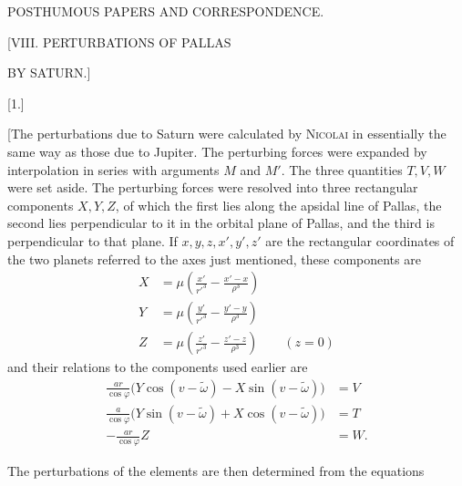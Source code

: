 \clearpage
\begingroup
{}
\renewcommand{\headrulewidth}{0pt}
\clearpage
{}
\begin{center}
\large POSTHUMOUS PAPERS AND CORRESPONDENCE.
\par\bigskip
\Large [VIII. PERTURBATIONS OF PALLAS\par BY SATURN.]
\par\bigskip
\normalsize [1.]
\end{center}
\begingroup
\small
\makeatletter\tagsleft@true\let\veqno\@@leqno\makeatother
\par\noindent\hspace*{\parindent}[The perturbations due to Saturn were calculated by \textsc{Nicolai} in essentially the same way
as those due to Jupiter. The perturbing forces were expanded by interpolation
in series with arguments \(M\) and \(M'\). The three quantities
\(T,V,W\) were set aside. The perturbing forces were resolved
into three rectangular components \(X,Y,Z\), of which the first lies along
the apsidal line of Pallas, the second lies perpendicular to it in the orbital plane of
Pallas, and the third is perpendicular to that plane. If \(x,y,z,x',y',z'\)
are the rectangular coordinates of the two planets referred to the axes just mentioned,
these components are
\[
\tag*{1)}
\begin{aligned}
X&=\mu\left(\frac{x'}{r'^3}-\frac{x'-x}{\rho^3}\right)\\[.6em]
Y&=\mu\left(\frac{y'}{r'^3}-\frac{y'-y}{\rho^3}\right)\\[.6em]
Z&=\mu\left(\frac{z'}{r'^3}-\frac{z'-z}{\rho^3}\right)\qquad(z=0)
\end{aligned}
\]
and their relations to the components used earlier are
\[
\begin{aligned}
\frac{ar}{\cos\varphi}\bigl(Y\cos(v-\tilde\omega)-X\sin(v-\tilde\omega)\bigr)&=V\\[.6em]
\frac{a}{\cos\varphi}\bigl(Y\sin(v-\tilde\omega)+X\cos(v-\tilde\omega)\bigr)&=T\\[.6em]
-\frac{ar}{\cos\varphi}Z&=W.
\end{aligned}
\]
\par\noindent\hspace*{\parindent}The perturbations of the elements are then determined from the equations
